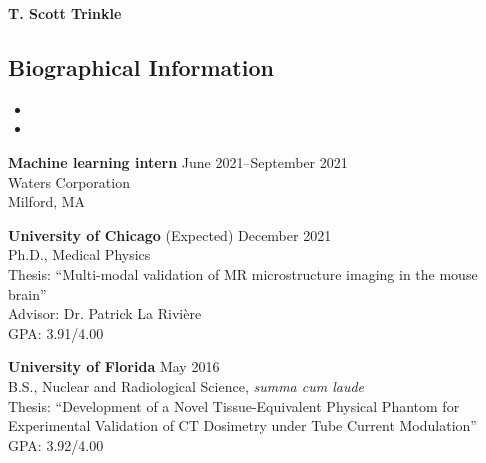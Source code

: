 \documentclass[10pt,letterpaper]{article}
\begin{document}
\begin{center}
{\LARGE \textbf{T. Scott Trinkle}}\\
\end{center}
\vspace{-1em}

\subsection*{Biographical Information}
\begin{itemize}[noitemsep]
\item[]  
\item[]  
\end{itemize}

\begin{benumerate}{1}
\item
  \textbf{Machine learning intern} \hfill June 2021--September 2021\\
  Waters Corporation\\
  Milford, MA
\end{benumerate}

\begin{benumerate}{2}
\item
  \textbf{University of Chicago} \hfill (Expected) December 2021\\
  Ph.D., Medical Physics\\
  Thesis: ``Multi-modal validation of MR microstructure imaging in the mouse brain''\\
  Advisor: Dr. Patrick La Rivi\`ere \\
  GPA: 3.91/4.00\\
\item
  \textbf{University of Florida} \hfill May 2016\\
  B.S., Nuclear and Radiological Science, \textit{summa cum laude}\\
  Thesis: ``Development of a Novel Tissue-Equivalent Physical Phantom for Experimental Validation
  of CT Dosimetry under Tube Current Modulation''\\ 
  GPA: 3.92/4.00\\
\end{benumerate}
\end{document}
